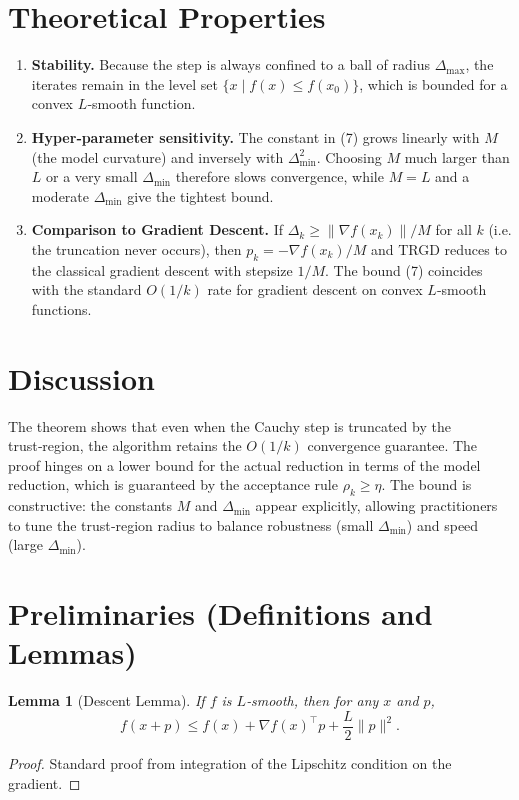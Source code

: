 \documentclass{article}
\newtheorem{lemma}{Lemma}
\begin{document}
\section*{Theoretical Properties}
\begin{enumerate}[label=\arabic*)]
\item \textbf{Stability.}  Because the step is always confined to a
ball of radius $\Delta_{\max}$, the iterates remain in the level set
$\{x\mid f(x)\le f(x_0)\}$, which is bounded for a convex $L$‑smooth
function.
\item \textbf{Hyper‑parameter sensitivity.}
The constant in (7) grows linearly with $M$ (the model curvature) and
inversely with $\Delta_{\min}^{2}$.  Choosing $M$ much larger than $L$
or a very small $\Delta_{\min}$ therefore slows convergence, while
$M=L$ and a moderate $\Delta_{\min}$ give the tightest bound.
\item \textbf{Comparison to Gradient Descent.}
If $\Delta_k\ge\| \nabla f(x_k)\|/M$ for all $k$ (i.e. the truncation never
occurs), then $p_k=-\nabla f(x_k)/M$ and TRGD reduces to the classical
gradient descent with stepsize $1/M$.  The bound (7) coincides with the
standard $O(1/k)$ rate for gradient descent on convex $L$‑smooth functions.
\end{enumerate}

\section*{Discussion}
The theorem shows that even when the Cauchy step is truncated by the
trust‑region, the algorithm retains the $O(1/k)$ convergence guarantee.
The proof hinges on a lower bound for the actual reduction in terms of
the model reduction, which is guaranteed by the acceptance rule
$\rho_k\ge\eta$.  The bound is constructive: the constants $M$ and
$\Delta_{\min}$ appear explicitly, allowing practitioners to tune the
trust‑region radius to balance robustness (small $\Delta_{\min}$) and
speed (large $\Delta_{\min}$).

\newpage
\section*{Preliminaries (Definitions and Lemmas)}
\begin{lemma}[Descent Lemma]\label{lem:descent}
If $f$ is $L$‑smooth, then for any $x$ and $p$,
\[
f(x+p)\le f(x)+\nabla f(x)^{\!\top}p+\frac{L}{2}\|p\|^{2}.
\tag{8}
\]
\end{lemma}
\begin{proof}
Standard proof from integration of the Lipschitz condition on the gradient.
\end{proof}
\end{document}
